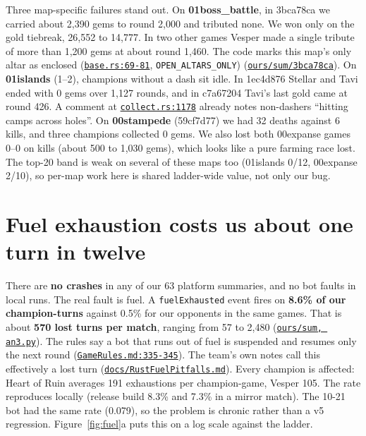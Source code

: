 \documentclass[11pt,a4paper]{article}
\newcommand{\scratch}{file:///private/tmp/claude-501/-Users-tristanbasri-Desktop-Code-cambridge-battlecode-s2/b3f4cb6b-e46a-405f-957c-42c44c05c8dc/scratchpad/ladder-data}
\newcommand{\repo}{file:///Users/tristanbasri/Desktop/Code/cambridge-battlecode-s2}
\newcommand{\src}[2]{{\small(\href{#1}{\textcolor{cTop}{\texttt{#2}}})}}
\newcommand{\code}[2]{\href{\repo/#1}{\texttt{\textcolor{cOurs!80!black}{#2}}}}
\newcommand{\vfive}{bots/bot-v5-r175199/src}
\begin{document}
Three map-specific failures stand out. On \textbf{01boss\_battle}, in 3bca78ca we carried about 2,390 gems to round 2,000 and tributed none. We won only on the gold tiebreak, 26,552 to 14,777. In two other games Vesper made a single tribute of more than 1,200 gems at about round 1,460. The code marks this map's only altar as enclosed (\code{\vfive/common/base.rs}{base.rs:69-81}, \texttt{OPEN\_ALTARS\_ONLY}) \src{\scratch/ours/sum/}{ours/sum/3bca78ca}. On \textbf{01islands} (1--2), champions without a dash sit idle. In 1ec4d876 Stellar and Tavi ended with 0 gems over 1,127 rounds, and in c7a67204 Tavi's last gold came at round 426. A comment at \code{\vfive/common/collect.rs}{collect.rs:1178} already notes non-dashers ``hitting camps across holes''. On \textbf{00stampede} (59cf7d77) we had 32 deaths against 6 kills, and three champions collected 0 gems. We also lost both 00expanse games 0--0 on kills (about 500 to 1,030 gems), which looks like a pure farming race lost. The top-20 band is weak on several of these maps too (01islands 0/12, 00expanse 2/10), so per-map work here is shared ladder-wide value, not only our bug.

\section{Fuel exhaustion costs us about one turn in twelve}

There are \textbf{no crashes} in any of our 63 platform summaries, and no bot faults in local runs. The real fault is fuel. A \texttt{fuelExhausted} event fires on \textbf{8.6\% of our champion-turns} against 0.5\% for our opponents in the same games. That is about \textbf{570 lost turns per match}, ranging from 57 to 2,480 \src{\scratch/ours/sum/}{ours/sum, an3.py}. The rules say a bot that runs out of fuel is suspended and resumes only the next round \src{\repo/docs/GameRules.md}{GameRules.md:335-345}. The team's own notes call this effectively a lost turn \src{\repo/docs/RustFuelPitfalls.md}{docs/RustFuelPitfalls.md}. Every champion is affected: Heart of Ruin averages 191 exhaustions per champion-game, Vesper 105. The rate reproduces locally (release build 8.3\% and 7.3\% in a mirror match). The 10-21 bot had the same rate (0.079), so the problem is chronic rather than a v5 regression. Figure~\ref{fig:fuel}a puts this on a log scale against the ladder.
\end{document}
